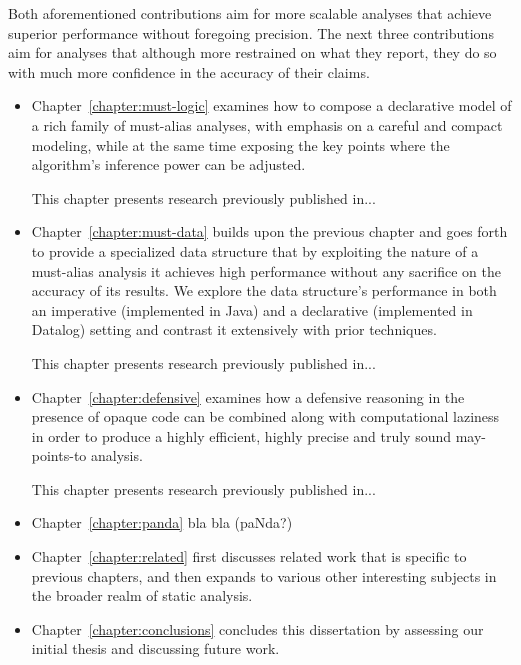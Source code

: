 Both aforementioned contributions aim for more scalable analyses that achieve
superior performance without foregoing precision. The next three contributions
aim for analyses that although more restrained on what they report, they do so
with much more confidence in the accuracy of their claims.

\begin{itemize}[$\bullet$]
\item Chapter~\ref{chapter:must-logic} examines how to compose a declarative
	model of a rich family of must-alias analyses, with emphasis on a careful
	and compact modeling, while at the same time exposing the key points
	where the algorithm's inference power can be adjusted.

	This chapter presents research previously published in...

\item Chapter~\ref{chapter:must-data} builds upon the previous chapter and goes
	forth to provide a specialized data structure that by exploiting the nature
	of a must-alias analysis it achieves high performance without any
	sacrifice on the accuracy of its results. We explore the data
	structure's performance in both an imperative (implemented in Java) and
	a declarative (implemented in Datalog) setting and contrast it
	extensively with prior techniques.

	This chapter presents research previously published in...

\item Chapter~\ref{chapter:defensive} examines how a defensive reasoning in the
	presence of opaque code can be combined along with computational laziness
	in order to produce a highly efficient, highly precise and truly sound
	may-points-to analysis.

	This chapter presents research previously published in...
\end{itemize}

\begin{itemize}[$\bullet$]
\item Chapter~\ref{chapter:panda} bla bla (paNda?)

\item Chapter~\ref{chapter:related} first discusses related work that is
	specific to previous chapters, and then expands to various other
	interesting subjects in the broader realm of static analysis.

\item Chapter~\ref{chapter:conclusions} concludes this dissertation by
	assessing our initial thesis and discussing future work.
\end{itemize}
